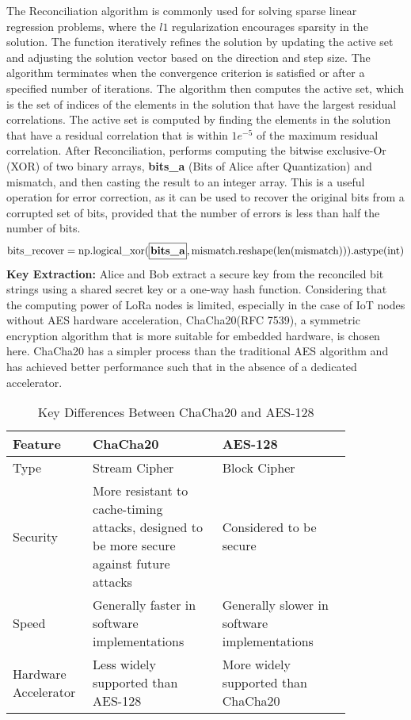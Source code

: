 The Reconciliation algorithm is commonly used for solving sparse linear regression problems, where the \(l1\) regularization encourages sparsity in the solution. The function iteratively refines the solution by updating the active set and adjusting the solution vector based on the direction and step size. The algorithm terminates when the convergence criterion is satisfied or after a specified number of iterations.
The algorithm then computes the active set, which is the set of indices of the elements in the solution that have the largest residual correlations. The active set is computed by finding the elements in the solution that have a residual correlation that is within \(1e^{-5}\) of the maximum residual correlation.
After Reconciliation, performs computing the bitwise exclusive-Or (XOR) of two binary arrays, \textbf{bits\_a} (Bits of Alice after Quantization) and mismatch, and then casting the result to an integer array. This is a useful operation for error correction, as it can be used to recover the original bits from a corrupted set of bits, provided that the number of errors is less than half the number of bits. 
  \[
  \text{{bits\_recover}} = \text{{np.logical\_xor}}(\textbf{\framebox[1.1\width]{{bits\_a}}}, \text{{mismatch}}.\text{{reshape}}(\text{{len}}(\text{{mismatch}}))).\text{{astype(int)}}
  \]
\textbf{Key Extraction:} Alice and Bob extract a secure key from the reconciled bit strings using a shared secret key or a one-way hash function. Considering that the computing power of LoRa nodes is limited, especially in the case of IoT nodes without AES hardware acceleration, ChaCha20(RFC 7539)\cite{rfc7539}, a symmetric encryption algorithm that is more suitable for embedded hardware, is chosen here. ChaCha20 has a simpler process than the traditional AES algorithm and has achieved better performance such that in the absence of a dedicated accelerator\cite{7507408,7927078}.
\begin{table}
    \centering
    \caption{Key Differences Between ChaCha20 and AES-128}
    \begin{tabular}{p{0.15\linewidth}p{0.35\linewidth}p{0.35\linewidth}}
      \toprule
      Feature&ChaCha20&AES-128\\
      \midrule
      Type&Stream Cipher&Block Cipher\\
      Security&More resistant to cache-timing attacks, designed to be more secure against future attacks&Considered to be secure\\
      Speed&Generally faster in software implementations&Generally slower in software implementations\\
      Hardware Accelerator&Less widely supported than AES-128&More widely supported than ChaCha20    \\
      \bottomrule
    \end{tabular}
    \label{tab:comparisonaeschacha}
\end{table}
